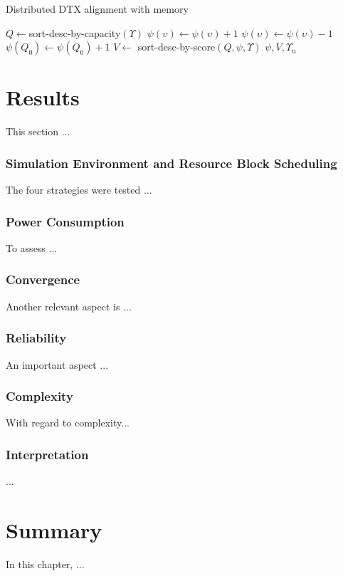 \begin{algorithm}
\caption{Distributed DTX alignment with memory}
\label{ch5alg1}
\begin{algorithmic}[1]
\STATE $Q \leftarrow $sort-desc-by-capacity$(\Upsilon)$
    \STATE $\psi(\upsilon) \leftarrow \psi(\upsilon) + 1$
  \ENDIF
\ENDFOR
{}
    \STATE $\psi(\upsilon) \leftarrow \psi(\upsilon) - 1$
  \ENDIF
\ENDFOR
\STATE $\psi (Q_0) \leftarrow \psi(Q_0) + 1$
\STATE $V \leftarrow $ sort-desc-by-score$(Q, \psi, \Upsilon)$
\RETURN $\psi, V, \Upsilon_{\mathrm{u}}$
\end{algorithmic}
\end{algorithm}

\section{Results}
\label{ch5:results}
This section ...
\subsubsection{Simulation Environment and Resource Block Scheduling}
The four strategies were tested ...
\subsubsection{Power Consumption}
To assess ...

\subsubsection{Convergence}
Another relevant aspect is ...

\subsubsection{Reliability}
An important aspect ...

\subsubsection{Complexity}
With regard to complexity...
\subsubsection{Interpretation}
...

\section{Summary}
\label{ch5:summary}
In this chapter, ...

